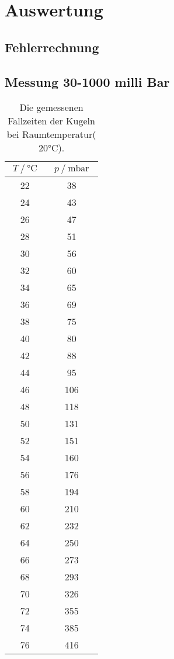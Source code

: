 \section{Auswertung}
\label{sec:Auswertung}
\subsection{Fehlerrechnung}
\subsection{Messung 30-1000 milli Bar}
\label{subsec:M30-1000}
\begin{table}
  \centering
  \caption{Die gemessenen Fallzeiten der Kugeln bei Raumtemperatur($20\unit{\celsius}$).}
  \begin{tabular}{cc}
    \toprule
    {$T \mathbin{/} \unit{\celsius}$} &
    {$p \mathbin{/} \unit{\milli\bar}$} \\
    \midrule
      22 &  38 \\
      24 &  43 \\
      26 &  47 \\
      28 &  51 \\
      30 &  56 \\
      32 &  60 \\
      34 &  65 \\
      36 &  69 \\
      38 &  75 \\
      40 &  80 \\
      42 &  88 \\
      44 &  95 \\
      46 & 106 \\
      48 & 118 \\
      50 & 131 \\
      52 & 151 \\
      54 & 160 \\
      56 & 176 \\
      58 & 194 \\
      60 & 210 \\
      62 & 232 \\
      64 & 250 \\
      66 & 273 \\
      68 & 293 \\
      70 & 326 \\
      72 & 355 \\
      74 & 385 \\
      76 & 416 \\

\end{tabular}
\end{table}
